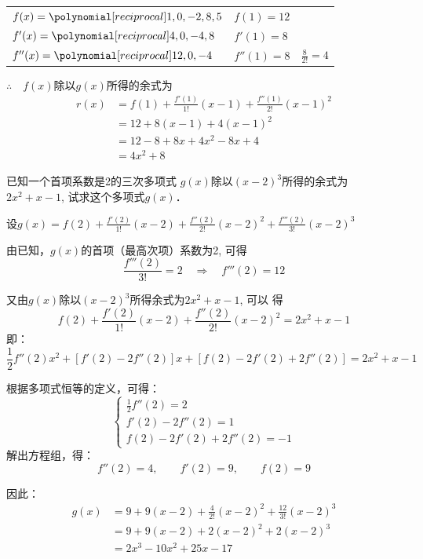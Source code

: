     \begin{solution}
\begin{center}
\begin{tabular}{lll}
$f(x)=\poly{1,0,-2,8,5}$  &  $f(1)=12$  \\
$f'(x)=\poly{4,0,-4,8}$  &  $f'(1)=8$  \\
$f''(x)=\poly{12,0,-4}$  &  $f''(1)=8$& $\frac{8}{2!}=4$  \\
\end{tabular}    
\end{center}
          
$\therefore\quad f(x)$除以$g(x)$所得的余式为
\[\begin{split}
    r(x)&=f(1)+\frac{f'(1)}{1!}(x-1)+\frac{f''(1)}{2!}(x-1)^2\\
    &=12+8(x-1)+4(x-1)^2\\
    &=12-8+8x+4x^2-8x+4\\
    &=4x^2+8
\end{split}\]
    \end{solution}

    \begin{example}
已知一个首项系数是2的三次多项式 $g(x)$除以$(x-2)^3$所得的余式为$2x^2+x-1$, 试求这个多项式$g(x)$．
    \end{example}    
    
    \begin{solution}
设$g(x)=f(2)+\frac{f'(2)}{1!}(x-2)+\frac{f''(2)}{2!}(x-2)^2+\frac{f'''(2)}{3!}(x-2)^3$

由已知，$g(x)$的首项（最高次项）系数为2, 可得
\[\frac{f'''(2)}{3!}=2\quad \Rightarrow\quad f'''(2)=12\]

又由$g(x)$除以$(x-2)^3$所得余式为$2x^2+x-1$, 可以
得       
\[f(2)+\frac{f'(2)}{1!}(x-2)+\frac{f''(2)}{2!}(x-2)^2=2x^2+x-1\]
即：
\[\frac{1}{2}f''(2)x^2+[f'(2)-2f''(2)]x+[f(2)-2f'(2)+2f''(2)]=2x^2+x-1\]
 
根据多项式恒等的定义，可得：
\[\begin{cases}
    \frac{1}{2}f''(2)=2\\
    f'(2)-2f''(2)=1\\
    f(2)-2f'(2)+2f''(2)=-1
\end{cases}\]
解出方程组，得：
\[f''(2)=4,\qquad f'(2)=9,\qquad f(2)=9\]

因此：
\[\begin{split}
    g(x)&=9+9(x-2)+\frac{4}{2!}(x-2)^2+\frac{12}{3!}(x-2)^3\\
    &=9+9(x-2)+2(x-2)^2+2(x-2)^3\\
    &=2x^3-10x^2+25x-17
\end{split}\]
   \end{solution}


